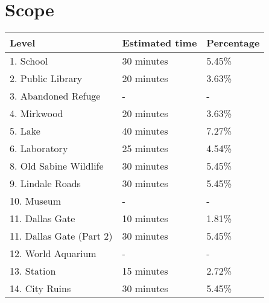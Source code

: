 \section{Scope}

\vspace*{0.5cm}

\begin{center}
	\begin{tabular}[c]{| p{6cm} | p{4cm} | p{3cm} |}
		\hline
		               \textbf{Level}                 & \textbf{Estimated time}     & \textbf{Percentage} \\ \hline
		                  1. School                   & 30 minutes                  & 5.45\%                 \\ \hline
		              2. Public Library               & 20 minutes                  & 3.63\%                 \\ \hline
		             3. Abandoned Refuge              & -			                & -	                  \\ \hline
		                 4. Mirkwood                  & 20 minutes                  & 3.63\%                 \\ \hline
		                   5. Lake                    & 40 minutes                  & 7.27\%                 \\ \hline
		                6. Laboratory                 & 25 minutes                  & 4.54\%                 \\ \hline
		           8. Old Sabine Wildlife             & 30 minutes                  & 5.45\%                 \\ \hline
		              9. Lindale Roads                & 30 minutes                  & 5.45\%                 \\ \hline
		                 10. Museum                   & -              			    & -      	          \\ \hline
		               11. Dallas Gate                & 10 minutes                  & 1.81\%                 \\ \hline
		          11. Dallas Gate (Part 2)		      & 30 minutes                  & 5.45\%                 \\ \hline
		             12. World Aquarium               & -        		     	    & -              	   \\ \hline
		                 13. Station                  & 15 minutes                  & 2.72\%                 \\ \hline
		               14. City Ruins                 & 30 minutes                  & 5.45\%                 \\ \hline

\end{tabular}
\end{center}
